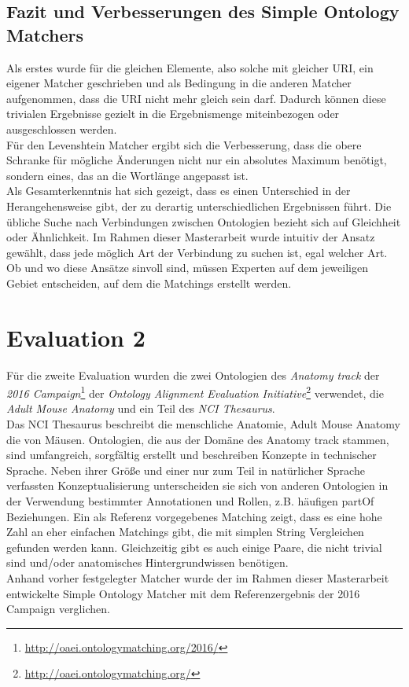 		\subsection{Fazit und Verbesserungen des Simple Ontology Matchers}
		Als erstes wurde für die gleichen Elemente, also solche mit gleicher URI, ein
		eigener Matcher geschrieben und als Bedingung in die anderen Matcher
		aufgenommen, dass die URI nicht mehr gleich sein darf. Dadurch können diese
		trivialen Ergebnisse gezielt in die Ergebnismenge miteinbezogen oder
		ausgeschlossen werden.\\
		Für den Levenshtein Matcher ergibt sich die Verbesserung, dass die obere
		Schranke für mögliche Änderungen nicht nur ein absolutes Maximum benötigt,
		sondern eines, das an die Wortlänge angepasst ist.\\
		Als Gesamterkenntnis hat sich gezeigt, dass es einen Unterschied in der
		Herangehensweise gibt, der zu derartig unterschiedlichen Ergebnissen führt.
		Die übliche Suche nach Verbindungen zwischen Ontologien bezieht sich auf
		Gleichheit oder Ähnlichkeit. Im Rahmen dieser Masterarbeit wurde intuitiv der
		Ansatz gewählt, dass jede möglich Art der Verbindung zu suchen ist, egal
		welcher Art. Ob und wo diese Ansätze sinvoll sind, müssen Experten auf dem
		jeweiligen Gebiet entscheiden, auf dem die Matchings erstellt werden.
		
		\section{Evaluation 2}
		\label{subsec:Evaluation 2}
		Für die zweite Evaluation wurden die zwei Ontologien des \textit{Anatomy track} der
		\textit{2016 Campaign}\footnote{\url{http://oaei.ontologymatching.org/2016/}} der
		\textit{Ontology Alignment Evaluation
		Initiative}\footnote{\url{http://oaei.ontologymatching.org/}} verwendet,
		die \textit{Adult Mouse Anatomy} und ein Teil des \textit{NCI Thesaurus}.\\
		Das NCI Thesaurus beschreibt die menschliche Anatomie, Adult Mouse Anatomy die von
		Mäusen. Ontologien, die aus der Domäne des Anatomy track stammen, sind
		umfangreich, sorgfältig erstellt und beschreiben Konzepte in technischer
		Sprache. Neben ihrer Größe und einer nur zum Teil in natürlicher Sprache
		verfassten Konzeptualisierung unterscheiden sie sich von anderen Ontologien in
		der Verwendung bestimmter Annotationen und Rollen, z.B. häufigen partOf
		Beziehungen. Ein als Referenz vorgegebenes Matching zeigt, dass es eine hohe
		Zahl an eher einfachen Matchings gibt, die mit simplen String Vergleichen gefunden werden
		kann. Gleichzeitig gibt es auch einige Paare, die nicht trivial sind und/oder
		anatomisches Hintergrundwissen benötigen.\cite{OAEI16}\\
		Anhand vorher festgelegter Matcher wurde der im Rahmen dieser Masterarbeit
		entwickelte Simple Ontology Matcher mit dem Referenzergebnis der 2016 Campaign verglichen.
		
